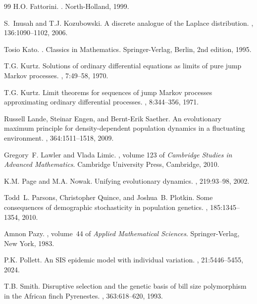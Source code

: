 \documentclass[12pt]{article}
\begin{document}
\begin{thebibliography}{99}
H.O. Fattorini.
.
\newblock North-Holland, 1999.

S.~Inusah and T.J. Kozubowski.
\newblock A discrete analogue of the {L}aplace distribution.
, 136:1090--1102, 2006.

Tosio Kato.
.
\newblock Classics in Mathematics. Springer-Verlag, Berlin, 2nd edition, 1995.

T.G. Kurtz.
\newblock Solutions of ordinary differential equations as limits of pure jump
  {M}arkov processes.
, 7:49--58, 1970.

T.G. Kurtz.
\newblock Limit theorems for sequences of jump {M}arkov processes approximating
  ordinary differential processes.
, 8:344--356, 1971.

Russell Lande, Steinar Engen, and Bernt-Erik Saether.
\newblock An evolutionary maximum principle for density-dependent population
  dynamics in a fluctuating environment.
,
  364:1511--1518, 2009.

Gregory~F. Lawler and Vlada Limic.
, volume 123 of {\em
  Cambridge Studies in Advanced Mathematics}.
\newblock Cambridge University Press, Cambridge, 2010.

K.M. Page and M.A. Nowak.
\newblock Unifying evolutionary dynamics.
, 219:93--98, 2002.

Todd~L. Parsons, Christopher Quince, and Joshua~B. Plotkin.
\newblock Some consequences of demographic stochasticity in population
  genetics.
, 185:1345--1354, 2010.

Amnon Pazy.
, volume~44 of {\em Applied Mathematical Sciences}.
\newblock Springer-Verlag, New York, 1983.

P.K. Pollett.
\newblock An {SIS} epidemic model with individual variation.
, 21:5446--5455, 2024.

T.B. Smith.
\newblock Disruptive selection and the genetic basis of bill size polymorphism
  in the {A}frican finch {Pyrenestes}.
, 363:618--620, 1993.


\end{thebibliography}
\end{document}
